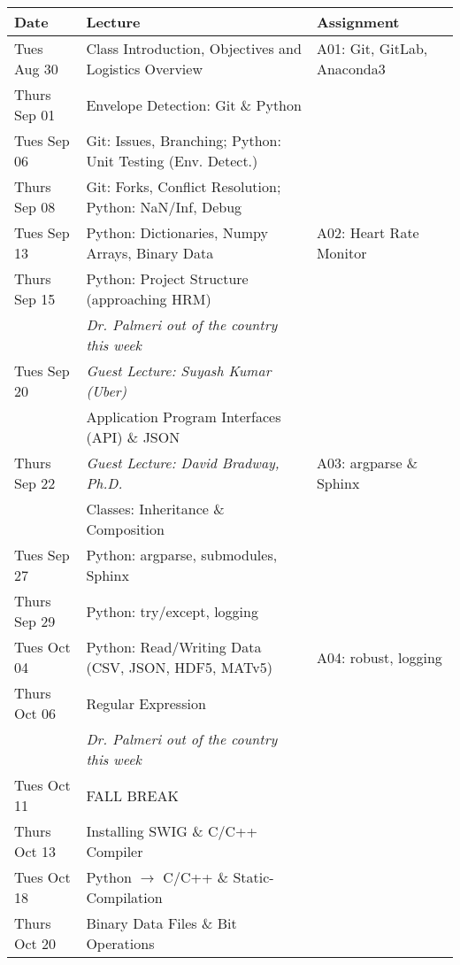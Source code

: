 \begin{longtable}[c]{|l|l|l|}

    \hline 
    
    \textbf{Date} & \textbf{Lecture} & \textbf{Assignment}\\

    \hline

    Tues Aug 30     & Class Introduction, Objectives and Logistics Overview & A01: Git, GitLab, Anaconda3 \\
    Thurs Sep 01    & Envelope Detection: Git \& Python & \\
    \hline
    Tues Sep 06     & Git: Issues, Branching; Python: Unit Testing (Env. Detect.)& \\
    Thurs Sep 08    & Git: Forks, Conflict Resolution; Python: NaN/Inf, Debug & \\
    \hline
    Tues Sep 13     & Python: Dictionaries, Numpy Arrays, Binary Data & A02: Heart Rate Monitor \\
    Thurs Sep 15    & Python: Project Structure (approaching HRM) & \\
    \hline
                    & \emph{Dr. Palmeri out of the country this week} & \\
    Tues Sep 20     & \emph{Guest Lecture: Suyash Kumar (Uber)} & \\
                    & Application Program Interfaces (API) \& JSON & \\
    Thurs Sep 22    & \emph{Guest Lecture: David Bradway, Ph.D.} & A03: argparse \& Sphinx\\
                    & Classes: Inheritance \& Composition & \\
    \hline
    Tues Sep 27     & Python: argparse, submodules, Sphinx & \\
    Thurs Sep 29    & Python: try/except, logging & \\
    \hline
    Tues Oct 04     & Python: Read/Writing Data (CSV, JSON, HDF5, MATv5) & A04: robust, logging \\
    Thurs Oct 06    & Regular Expression & \\
    \hline
                    & \emph{Dr. Palmeri out of the country this week} & \\
    Tues Oct 11     & FALL BREAK & \\
    Thurs Oct 13    & Installing SWIG \& C/C++ Compiler & \\
    \hline
    Tues Oct 18     & Python $\rightarrow$ C/C++ \& Static-Compilation & \\
    Thurs Oct 20    & Binary Data Files \& Bit Operations & \\

\end{longtable}

